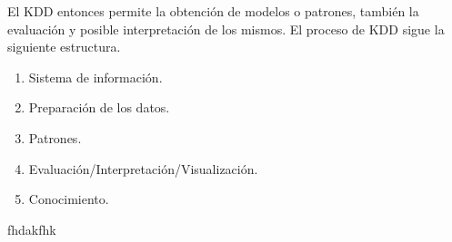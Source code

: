 \documentclass{article}
\begin{document}
El KDD entonces permite la obtención de modelos o patrones, también la evaluación y posible interpretación de los mismos. El proceso de KDD sigue la siguiente
estructura.

\begin{enumerate}
  \item Sistema de información.
  \item Preparación de los datos.
  \item Patrones.
  \item Evaluación/Interpretación/Visualización.
  \item Conocimiento.
\end{enumerate}


fhdakfhk
\end{document}
